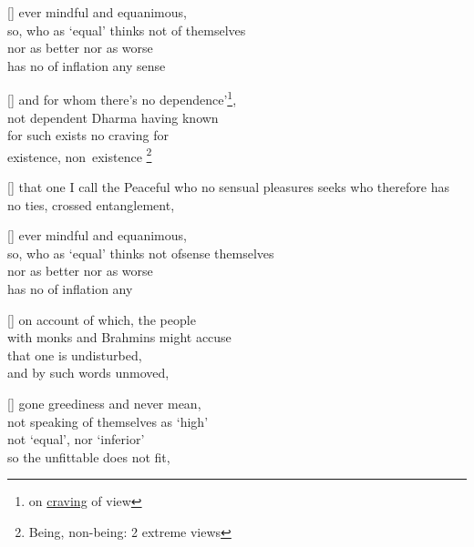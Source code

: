\begin{MyDescription}{}[]
ever mindful and equanimous,\\
so, who as `equal' thinks not of themselves\\
nor as better nor as worse\\
has no of inflation any sense
\end{MyDescription}

\begin{MyDescription}{}[]
and for whom there's no dependence'\footnote{on \underline{craving} of view},\\
not dependent Dharma having known\\
for such exists no craving for\\
existence, non~existence \footnote{Being, non-being: 2 extreme views}
\end{MyDescription}

\begin{MyDescription}{}[]
that one I call the Peaceful
who no sensual pleasures seeks
who therefore has no ties,
crossed entanglement,
\end{MyDescription}

\begin{MyDescription}{}[]
ever mindful and equanimous,\\
so, who as `equal' thinks not ofsense themselves\\
nor as better nor as worse\\
has no of inflation any 
\end{MyDescription}

\begin{MyDescription}{}[]
on account of which, the people\\
with monks and Brahmins might accuse\\
that one is undisturbed,\\
and by such words unmoved,
\end{MyDescription}

\begin{MyDescription}{}[]
gone greediness and never mean,\\
not speaking of themselves as `high'\\
not `equal', nor `inferior'\\
so the unfittable does not fit,
\end{MyDescription}

